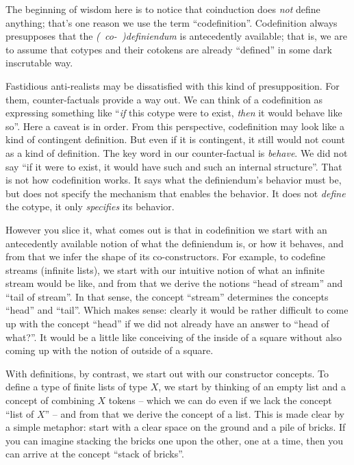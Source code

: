 The beginning of wisdom here is to notice that coinduction does
\textit{not} define anything; that's one reason we use the term
``codefinition''. Codefinition always presupposes that the
\textit{(~co-~)definiendum} is antecedently available; that is, we are
to assume that cotypes and their cotokens are already ``defined'' in
some dark inscrutable way.

Fastidious anti-realists may be dissatisfied with this kind of
presupposition. For them, counter-factuals provide a way out. We can
think of a codefinition as expressing something like ``\textit{if}
this cotype were to exist, \textit{then} it would behave like so''.
Here a caveat is in order. From this perspective, codefinition may
look like a kind of contingent definition. But even if it is
contingent, it still would not count as a kind of definition. The key
word in our counter-factual is \textit{behave}. We did not say ``if it
were to exist, it would have such and such an internal structure''.
That is not how codefinition works. It says what the definiendum's
behavior must be, but does not specify the mechanism that enables the
behavior. It does not \textit{define} the cotype, it only
\textit{specifies} its behavior.

However you slice it, what comes out is that in codefinition we start
with an antecedently available notion of what the definiendum is, or
how it behaves, and from that we infer the shape of its
co-constructors. For example, to codefine streams (infinite lists), we
start with our intuitive notion of what an infinite stream would be
like, and from that we derive the notions ``head of stream'' and ``tail
of stream''. In that sense, the concept ``stream'' determines the
concepts ``head'' and ``tail''. Which makes sense: clearly it would be
rather difficult to come up with the concept ``head'' if we did not
already have an answer to ``head of what?''. It would be a little
like conceiving of the inside of a square without also coming up with
the notion of outside of a square.

With definitions, by contrast, we start out with our constructor
concepts. To define a type of finite lists of type \(X\), we start by
thinking of an empty list and a concept of combining \(X\) tokens --
which we can do even if we lack the concept ``list of \(X\)'' -- and
from that we derive the concept of a list. This is made clear by a
simple metaphor: start with a clear space on the ground and a pile of
bricks. If you can imagine stacking the bricks one upon the other, one
at a time, then you can arrive at the concept ``stack of bricks''.

